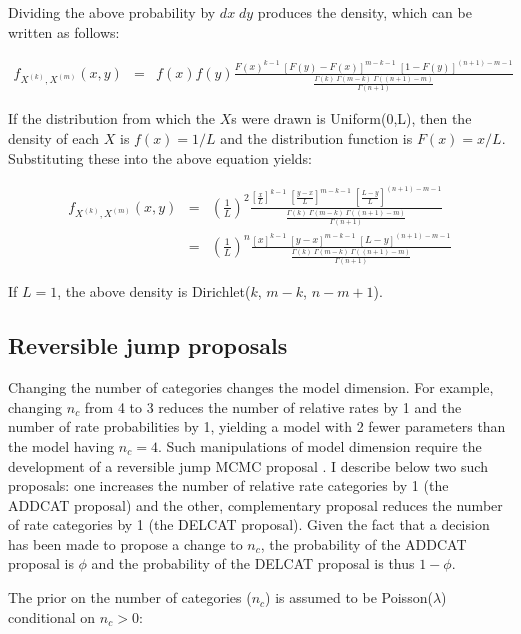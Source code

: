 \documentclass[12pt]{article}
\newcommand{\ncat}{n_c}
\begin{document}
Dividing the above probability by $dx \; dy$ produces the density, which can be written as follows:

\begin{eqnarray*}
f_{X^{(k)}, X^{(m)}}(x,y) & = & f(x) f(y) \frac{F(x)^{k-1} \; \left[ F(y) - F(x) \right]^{m-k-1} \; \left[ 1 - F(y) \right]^{(n+1)-m-1}}{\frac{\Gamma(k) \; \Gamma(m-k) \; \Gamma((n+1)-m)}{\Gamma(n+1)}}
\end{eqnarray*}

If the distribution from which the $X$s were drawn is Uniform(0,L), then the density of each $X$ is $f(x) = 1/L$ and the distribution function is $F(x) = x/L$. Substituting these into the above equation yields:

\begin{eqnarray*}
f_{X^{(k)}, X^{(m)}}(x,y) & = & \left( \frac{1}{L} \right)^2 \frac{\left[ \frac{x}{L} \right]^{k-1} \; \left[ \frac{y-x}{L} \right]^{m-k-1} \; \left[ \frac{L-y}{L} \right]^{(n+1)-m-1}}{\frac{\Gamma(k) \; \Gamma(m-k) \; \Gamma((n+1)-m)}{\Gamma(n+1)}} \\
& = & \left( \frac{1}{L} \right)^n \frac{\left[x\right]^{k-1} \; \left[y-x\right]^{m-k-1} \; \left[L-y\right]^{(n+1)-m-1}}{\frac{\Gamma(k) \; \Gamma(m-k) \; \Gamma((n+1)-m)}{\Gamma(n+1)}}
\end{eqnarray*}

If $L=1$, the above density is Dirichlet($k$, $m-k$, $n-m+1$).

\subsection{Reversible jump proposals}

Changing the number of categories changes the model dimension. For example, changing $\ncat$ from 4 to 3 reduces the number of relative rates by 1 and the number of rate probabilities by 1, yielding a model with 2 fewer parameters than the model having $\ncat = 4$. Such manipulations of model dimension require the development of a reversible jump MCMC proposal \citep{Green1995}. I describe below two such proposals: one increases the number of relative rate categories by 1 (the ADDCAT proposal) and the other, complementary proposal reduces the number of rate categories by 1 (the DELCAT proposal). Given the fact that a decision has been made to propose a change to $\ncat$, the probability of the ADDCAT proposal is $\phi$ and the probability of the DELCAT proposal is thus $1-\phi$. 

The prior on the number of categories ($\ncat$) is assumed to be Poisson($\lambda$) conditional on $\ncat > 0$:
\end{document}
